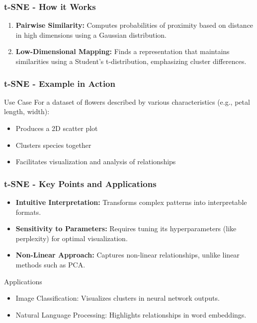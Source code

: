 \documentclass[aspectratio=169]{beamer}
\begin{document}
\begin{frame}[fragile]
    \frametitle{t-SNE - How it Works}
    \begin{enumerate}
        \item \textbf{Pairwise Similarity:} Computes probabilities of proximity based on distance in high dimensions using a Gaussian distribution.
        \item \textbf{Low-Dimensional Mapping:} Finds a representation that maintains similarities using a Student's t-distribution, emphasizing cluster differences.
    \end{enumerate}
\end{frame}

\begin{frame}[fragile]
    \frametitle{t-SNE - Example in Action}
    \begin{block}{Use Case}
        For a dataset of flowers described by various characteristics (e.g., petal length, width):
    \end{block}
    \begin{itemize}
        \item Produces a 2D scatter plot
        \item Clusters species together
        \item Facilitates visualization and analysis of relationships
    \end{itemize}
\end{frame}

\begin{frame}[fragile]
    \frametitle{t-SNE - Key Points and Applications}
    \begin{itemize}
        \item \textbf{Intuitive Interpretation:} Transforms complex patterns into interpretable formats.
        \item \textbf{Sensitivity to Parameters:} Requires tuning its hyperparameters (like perplexity) for optimal visualization.
        \item \textbf{Non-Linear Approach:} Captures non-linear relationships, unlike linear methods such as PCA.
    \end{itemize}
    \begin{block}{Applications}
        \begin{itemize}
            \item Image Classification: Visualizes clusters in neural network outputs.
            \item Natural Language Processing: Highlights relationships in word embeddings.
        \end{itemize}
    \end{block}
\end{frame}
\end{document}
